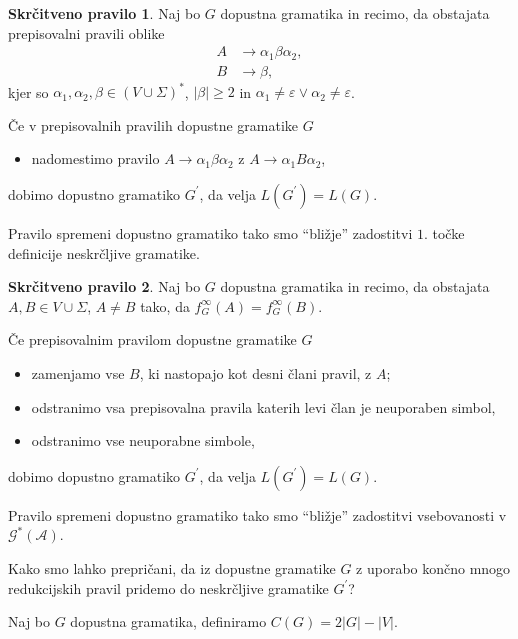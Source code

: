 \documentclass[fin1, tisk]{fmfdelo}
\providecommand{\abs}[1]{\left\lvert #1 \right\rvert}
\newcommand{\A}{\mathcal{A}}
\newcommand{\G}{\mathcal{G}}
\theoremstyle{definition}
\newtheorem{pravilo}{Skrčitveno pravilo}
\begin{document}
\begin{pravilo}
    Naj bo $G$ dopustna gramatika in recimo, da obstajata prepisovalni pravili oblike
    \begin{align*}
        A &\rightarrow \alpha_1 \beta \alpha_2, \\
        B &\rightarrow \beta,
    \end{align*}
    kjer so $\alpha_1, \alpha_2, \beta \in (V \cup \Sigma)^*$, $\abs{\beta} \geq 2$
    in $\alpha_1 \neq \varepsilon \vee \alpha_2 \neq \varepsilon$.

    Če v prepisovalnih pravilih dopustne gramatike $G$
    \begin{itemize}
        \item nadomestimo pravilo $A \rightarrow \alpha_1 \beta \alpha_2$ z
        $A \rightarrow \alpha_1 B \alpha_2$,
    \end{itemize}
    dobimo dopustno gramatiko $G^\prime$, da velja $L(G^\prime) = L(G)$.

    Pravilo spremeni dopustno gramatiko tako smo ``bližje'' zadostitvi $1.$ točke definicije 
    neskrčljive gramatike.
\end{pravilo}

\begin{pravilo}
    Naj bo $G$ dopustna gramatika in recimo, da obstajata $A,B \in V \cup \Sigma$, $A \neq B$ tako,
    da $f^\infty_G(A) = f^\infty_G(B)$.

    Če prepisovalnim pravilom dopustne gramatike $G$
    \begin{itemize}
        \item zamenjamo vse $B$, ki nastopajo kot desni člani pravil, z $A$;
        \item odstranimo vsa prepisovalna pravila katerih levi član je neuporaben simbol,
        \item odstranimo vse neuporabne simbole,
    \end{itemize}
    dobimo dopustno gramatiko $G^\prime$, da velja $L(G^\prime) = L(G)$. 

    Pravilo spremeni dopustno gramatiko tako smo ``bližje'' zadostitvi vsebovanosti v $\G^*(\A)$.
\end{pravilo}

Kako smo lahko prepričani, da iz dopustne gramatike $G$ z uporabo končno mnogo redukcijskih pravil
pridemo do neskrčljive gramatike $G^\prime$?

\begin{definicija}
    Naj bo $G$ dopustna gramatika, definiramo $C(G) = 2 \abs{G} - \abs{V}$.
\end{definicija}
\end{document}
